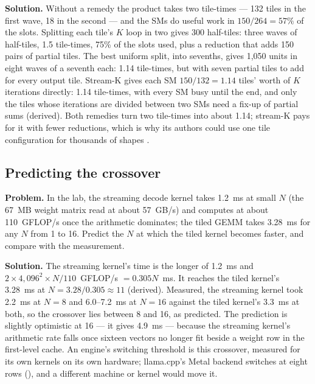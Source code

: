 \textbf{Solution.} Without a remedy the product takes two tile-times --- 132 tiles
in the first wave, 18 in the second --- and the SMs do useful work in
$150/264 = 57\%$ of the slots. Splitting each tile's $K$ loop in two gives 300
half-tiles: three waves of half-tiles, 1.5 tile-times, 75\% of the slots used,
plus a reduction that adds 150 pairs of partial tiles. The best uniform split,
into sevenths, gives 1,050 units in eight waves of a seventh each: 1.14
tile-times, but with seven partial tiles to add for every output tile. Stream-K
gives each SM $150/132 = 1.14$ tiles' worth of $K$ iterations directly: 1.14
tile-times, with every SM busy until the end, and only the tiles whose
iterations are divided between two SMs need a fix-up of partial sums (derived).
Both remedies turn two tile-times into about 1.14; stream-K pays for it with
fewer reductions, which is why its authors could use one tile configuration for
thousands of shapes \cite{osama2023streamk}.

\subsection{Predicting the crossover}
\textbf{Problem.} In the lab, the streaming decode kernel takes 1.2~ms at small
$N$ (the 67~MB weight matrix read at about 57~GB/s) and computes at about
110~GFLOP/s once the arithmetic dominates; the tiled GEMM takes 3.28~ms for any
$N$ from 1 to 16. Predict the $N$ at which the tiled kernel becomes faster, and
compare with the measurement.

\textbf{Solution.} The streaming kernel's time is the longer of 1.2~ms and
$2 \times 4{,}096^2 \times N / 110$~GFLOP/s $= 0.305N$~ms. It reaches the tiled
kernel's 3.28~ms at $N = 3.28 / 0.305 \approx 11$ (derived). Measured, the
streaming kernel took 2.2~ms at $N = 8$ and 6.0--7.2~ms at $N = 16$ against the
tiled kernel's 3.3~ms at both, so the crossover lies between 8 and 16, as
predicted. The prediction is slightly optimistic at 16 --- it gives 4.9~ms ---
because the streaming kernel's arithmetic rate falls once sixteen vectors no
longer fit beside a weight row in the first-level cache. An engine's switching
threshold is this crossover, measured for its own kernels on its own hardware;
llama.cpp's Metal backend switches at eight rows (), and a
different machine or kernel would move it.
